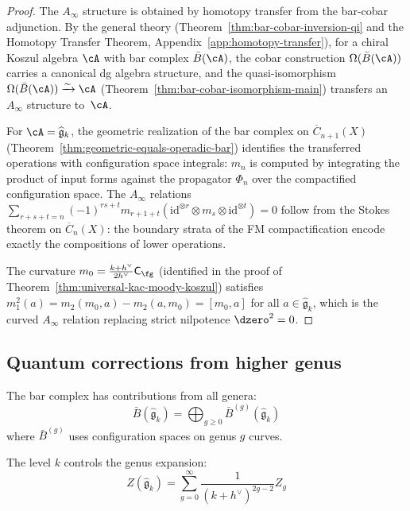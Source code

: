 \begin{proof}
The $A_\infty$ structure is obtained by homotopy transfer from the bar-cobar adjunction. By the general theory (Theorem~\ref{thm:bar-cobar-inversion-qi} and the Homotopy Transfer Theorem, Appendix~\ref{app:homotopy-transfer}), for a chiral Koszul algebra $\cA$ with bar complex $\bar{B}(\cA)$, the cobar construction $\Omega(\bar{B}(\cA))$ carries a canonical dg algebra structure, and the quasi-isomorphism $\Omega(\bar{B}(\cA)) \xrightarrow{\sim} \cA$ (Theorem~\ref{thm:bar-cobar-isomorphism-main}) transfers an $A_\infty$ structure to~$\cA$.

For $\cA = \widehat{\mathfrak{g}}_k$, the geometric realization of the bar complex on $\overline{C}_{n+1}(X)$ (Theorem~\ref{thm:geometric-equals-operadic-bar}) identifies the transferred operations with configuration space integrals: $m_n$ is computed by integrating the product of input forms against the propagator $\Phi_n$ over the compactified configuration space. The $A_\infty$ relations $\sum_{r+s+t=n}(-1)^{rs+t} m_{r+1+t}(\mathrm{id}^{\otimes r} \otimes m_s \otimes \mathrm{id}^{\otimes t}) = 0$ follow from the Stokes theorem on $\overline{C}_n(X)$: the boundary strata of the FM compactification encode exactly the compositions of lower operations.

The curvature
$m_0 = \frac{k+h^\vee}{2h^\vee}\mathsf C_{\fg}$
(identified in the proof of
Theorem~\ref{thm:universal-kac-moody-koszul}) satisfies
$m_1^2(a) = m_2(m_0, a) - m_2(a, m_0) = [m_0, a]$
for all $a \in \widehat{\mathfrak{g}}_k$, which is the curved
$A_\infty$ relation replacing strict nilpotence $\dzero^2 = 0$.
\end{proof}

\subsection{Quantum corrections from higher genus}

\begin{remark}
The bar complex has contributions from all genera:
\begin{equation}
\bar{B}(\widehat{\mathfrak{g}}_k) = \bigoplus_{g \geq 0} \bar{B}^{(g)}(\widehat{\mathfrak{g}}_k)
\end{equation}
where $\bar{B}^{(g)}$ uses configuration spaces on genus $g$ curves.

The level $k$ controls the genus expansion:
\begin{equation}
Z(\widehat{\mathfrak{g}}_k) = \sum_{g=0}^\infty \frac{1}{(k+h^\vee)^{2g-2}} Z_g
\end{equation}
\end{remark}

